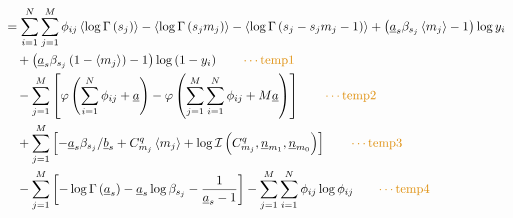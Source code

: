 \documentclass[11pt]{article}
\begin{document}
\begin{align*}
  &= \sum_{i=1}^{N}\sum_{j=1}^{M}\phi_{ij} \left\langle \log \Gamma\left(s_{j}\right)\right\rangle -\left\langle \log \Gamma\left(s_{j}m_{j}\right)\right\rangle -\left\langle \log \Gamma \left(s_{j}-s_{j}m_{j}-1\right)\right\rangle +\left(\underline{a}_{s}\beta_{s_{j}}\left\langle m_{j}\right\rangle -1 \right)\log y_{i}\\
  &\quad +\left(\underline{a}_{s}\beta_{s_{j}}\left(1-\left\langle m_{j}\right\rangle\right)-1\right)\log \left(1-y_{i}\right) \qquad \textcolor{myorange}{\cdots \text{temp1}}\\
  &\quad -\sum_{j=1}^{M}\left[\varphi\left(\sum_{i=1}^{N}\phi_{ij} + \underline{a}\right) - \varphi\left(\sum_{j=1}^{M}\sum_{i=1}^{N}\phi_{ij} +M\underline{a}\right) \right] \qquad \textcolor{myorange}{\cdots \text{temp2}}\\
  &\quad +\sum_{j=1}^{M}\left[-\underline{a}_{s}\beta_{s_{j}}/\underline{b}_{s} + C_{m_{j}}^{q}\left\langle m_{j} \right\rangle +\log \mathcal{I}\left(C_{m_{j}}^{q}, \underline{n}_{m_{1}}, \underline{n}_{m_{0}}\right)\right] \qquad \textcolor{myorange}{\cdots \text{temp3}}\\
  &\quad -\sum_{j=1}^{M}\left[-\log \Gamma\left(\underline{a}_{s}\right)-\underline{a}_{s}\log \beta_{s_{j}} -\frac{1}{\underline{a}_{s}-1} \right] -\sum_{j=1}^{M}\sum_{i=1}^{N}\phi_{ij}\log \phi_{ij} \qquad \textcolor{myorange}{\cdots \text{temp4}}
\end{align*}
\end{document}

